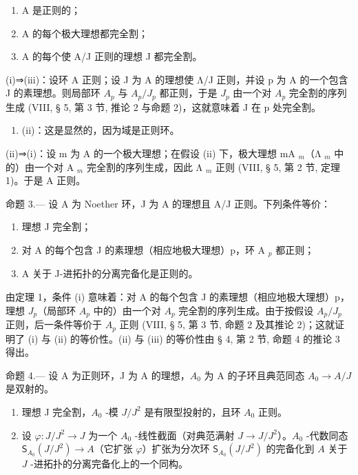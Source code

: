 \begin{enumerate}
\def\labelenumi{(\roman{enumi})}
\item
  A 是正则的；
\item
  A 的每个极大理想都完全割；
\item
  A 的每个使 A/J 正则的理想 J 都完全割。
\end{enumerate}

(i)⇒(iii)：设环 A 正则；设 J 为 A 的理想使 Λ/J 正则，并设 p 为 A 的一个包含 J 的素理想。则局部环 \(A_{p}\) 与 \(A_{p}/J_{p}\) 都正则，于是 \(J_{p}\) 由一个对 \(A_{p}\) 完全割的序列生成 (VIII, § 5, 第 3 节, 推论 2 与命题 2)，这就意味着 J 在 p 处完全割。

\begin{enumerate}
\def\labelenumi{(\roman{enumi})}
\setcounter{enumi}{2}
\tightlist
\item
  (ii)：这是显然的，因为域是正则环。
\end{enumerate}

(ii)⇒(i)：设 m 为 A 的一个极大理想；在假设 (ii) 下，极大理想 mA \(_{m}\)（Λ \(_{m}\) 中的）由一个对 A \(_{m}\) 完全割的序列生成，因此 Λ \(_{m}\) 正则 (VIII, § 5, 第 2 节, 定理 1)。于是 A 正则。

命题 3.--- 设 A 为 Noether 环，J 为 A 的理想且 A/J 正则。下列条件等价：

\begin{enumerate}
\def\labelenumi{(\roman{enumi})}
\item
  理想 J 完全割；
\item
  对 A 的每个包含 J 的素理想（相应地极大理想）p，环 A \(_{p}\) 都正则；
\item
  A 关于 J-进拓扑的分离完备化是正则的。
\end{enumerate}

由定理 1，条件 (i) 意味着：对 A 的每个包含 J 的素理想（相应地极大理想）p，理想 \(J_{p}\)（局部环 \(A_{p}\) 中的）由一个对 \(A_{p}\) 完全割的序列生成。由于按假设 \(A_{p}/J_{p}\) 正则，后一条件等价于 \(A_{p}\) 正则 (VIII, § 5, 第 3 节, 命题 2 及其推论 2)；这就证明了 (i) 与 (ii) 的等价性。(ii) 与 (iii) 的等价性由 § 4, 第 2 节, 命题 4 的推论 3 得出。

命题 4.--- 设 A 为正则环，J 为 A 的理想，\(A_{0}\) 为 A 的子环且典范同态 \(A_{0} \rightarrow A/J\) 是双射的。

\begin{enumerate}
\def\labelenumi{\alph{enumi})}
\item
  理想 J 完全割，\(A_{0}\) -模 \(J/J^{2}\) 是有限型投射的，且环 \(A_{0}\) 正则。
\item
  设 \(\varphi: J/J^{2} \to J\) 为一个 \(A_{0}\) -线性截面（对典范满射 \(J \to J/J^{2}\)）。\(A_{0}\) -代数同态 \(\mathsf{S}_{A_{0}}(J/J^{2}) \longrightarrow A\)（它扩张 \(\varphi\)）扩张为分次环 \(\mathsf{S}_{A_{0}}(J/J^{2})\) 的完备化到 \(A\) 关于 \(J\) -进拓扑的分离完备化上的一个同构。
\end{enumerate}

